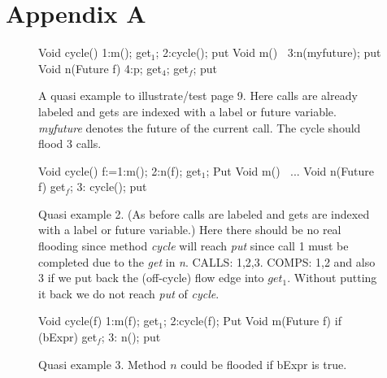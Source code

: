 \documentclass[12pt]{article}%
\begin{document}

% 

%

\newpage
\section*{Appendix A}

\begin{figure}[ht]
\begin{abs}
Void cycle()      {1:m(); get$_1$; 2:cycle(); put}
Void m()$\ \ \ \ ${3:n(myfuture); put}
Void n(Future f)  {4:p; get$_4$; get$_f$; put}
\end{abs}
\caption{\label{example-quasi}
A  quasi example to illustrate/test page 9.
Here calls are already labeled and gets are indexed with
a label or future variable. \emph{myfuture} denotes the
future of the current call. The cycle should flood 3 calls.}
\end{figure}

\begin{figure}[h]
\begin{abs}
Void cycle()      {f:=1:m(); 2:n(f); get$_1$; Put}
Void m()$\ \ \ \ ${...}
Void n(Future f)  {get$_f$; 3: cycle(); put}
\end{abs}
\caption{\label{example-quasi2}
  Quasi example 2.
(As before calls are  labeled and gets are indexed with
a label or future variable.) 
%
Here there should be no real flooding since method
 \emph{cycle} will reach  \emph{put} since call 1 must be completed
due to the   \emph{get} in  \emph{n}.
CALLS: 1,2,3.  
COMPS: 1,2 and also 3 if we put back the (off-cycle)  flow edge into 
 $get_1$.
Without putting it back we do not reach \emph{put} of \emph{cycle}.}
\end{figure}

\begin{figure}[h]
\begin{abs}
Void cycle(f)      {1:m(f); get$_1$; 2:cycle(f); Put}
Void m(Future f)  {if (bExpr) {get$_f$; 3: n();}  put}
\end{abs}
\caption{\label{example-quasi3}
  Quasi example 3.
Method
$n$ could be flooded if bExpr is true.%
}
\end{figure}
\vfill
\end{document}
